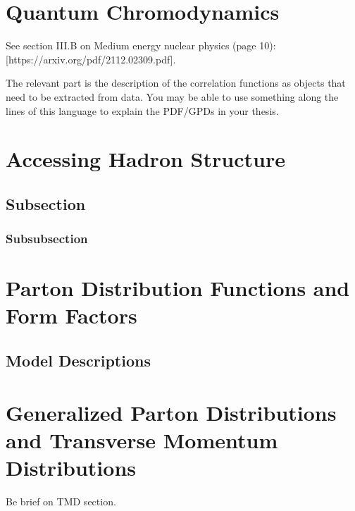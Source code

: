 \label{Chapter-3}

\hypertarget{Section-3.1}{%
\section{Quantum Chromodynamics}\label{Section-3.1}}

See section III.B on Medium energy nuclear physics (page 10):
{[}https://arxiv.org/pdf/2112.02309.pdf{]}.

The relevant part is the description of the correlation functions as
objects that need to be extracted from data. You may be able to use
something along the lines of this language to explain the PDF/GPDs in
your thesis.

\hypertarget{Section-3.2}{%
\section{Accessing Hadron Structure}\label{Section-3.2}}

\hypertarget{subsection}{%
\subsection{Subsection}\label{subsection}}

\hypertarget{subsubsection}{%
\subsubsection{Subsubsection}\label{subsubsection}}

\hypertarget{Section-3.3}{%
\section{Parton Distribution Functions and Form
Factors}\label{Section-3.3}}

\hypertarget{model-descriptions}{%
\subsection{Model Descriptions}\label{model-descriptions}}

\hypertarget{Section-3.4}{%
\section{Generalized Parton Distributions and Transverse Momentum
Distributions}\label{Section-3.4}}

Be brief on TMD section.


